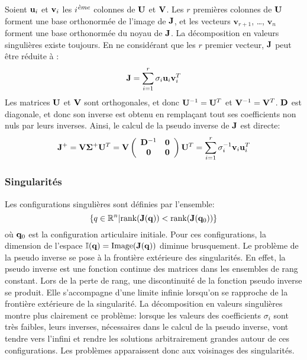 Soient ${\mathbf{u}}_i$ et ${\mathbf{v}}_i$ les $i^{\mbox{\footnotesize\it ème}}$ colonnes de ${\mathbf{U}}$ et ${\mathbf{V}}$. 
Les $r$ premières colonnes de ${\mathbf{U}}$ forment une base orthonormée de l'image de ${\mathbf{J}}$, et 
les vecteurs $\mathbf{v}_{r+1}$, \ldots, $\mathbf{v}_n$ forment une base orthonormée du noyau de ${\mathbf{J}}$. 
La décomposition en valeurs singulières existe toujours. En ne considérant que les $r$ premier
vecteur, ${\mathbf{J}}$ peut être
réduite à :
\begin{equation}
  {\mathbf{J}} = \sum_{i=1}^{r} \sigma_i \mathbf{u}_i
	\mathbf{v}_i^T
\end{equation}
Les matrices ${\mathbf{U}}$ et ${\mathbf{V}}$ sont orthogonales, et donc
${\mathbf{U}}^{-1} = {\mathbf{U}}^T$ et ${\mathbf{V}}^{-1} = {\mathbf{V}}^T$. ${\mathbf{D}}$ est diagonale,
et donc son inverse est obtenu en remplaçant tout ses coefficients
non nuls par leurs inverses. Ainsi, 
le calcul de la pseudo inverse de ${\mathbf{J}}$ est directe:
\begin{equation}
  {\mathbf{J}}^+ = {\mathbf{V}} {\mathbf{\Sigma}}^+ {\mathbf{U}}^T = {\mathbf{V}} \left( \begin{array}{cc}
    {\mathbf{D}}^{-1} & \textbf{0}\\
    \textbf{0} & \textbf{0}
  \end{array} \right) {\mathbf{U}}^T  = \sum_{i=1}^r \sigma_{i}^{-1} \mathbf{v}_i \mathbf{u}_i^{T}
\end{equation}

\subsubsection{Singularités}
Les configurations singulières sont définies par l'ensemble:
\begin{equation}
  \left\{ q \in \mathbb{R}^n | \mathrm{rank}(\mbf{J}(\mbf{q})) < \mathrm{rank}(\mbf{J}(\mbf{q}_0)) \right\}
  \label{eq:singularity}
\end{equation}
\noindent où ${\mathbf{q}}_0$ est la configuration articulaire initiale.
Pour ces configurations, la dimension de l'espace $\mathbb{I}({\mathbf{q}}) = \mathrm{Image}({\mathbf{J}}({\mathbf{q}}))$
diminue brusquement.
Le problème de la pseudo inverse se pose à la frontière extérieure des singularités.
En effet, la pseudo inverse est une fonction continue des matrices dans les ensembles
de rang constant. Lors de la perte de rang, une discontinuité de la fonction 
pseudo inverse se produit. Elle s'accompagne d'une limite infinie lorsqu'on se rapproche de la
frontière extérieure de la singularité.
La décomposition en valeurs singulières montre plus clairement ce problème:
lorsque les valeurs des coefficients $\sigma_i$ sont très faibles,
leurs inverses, nécessaires dans le calcul de la pseudo inverse, vont tendre
vers l'infini et rendre les solutions arbitrairement grandes autour de ces configurations.
Les problèmes apparaissent donc aux voisinages des singularités.

